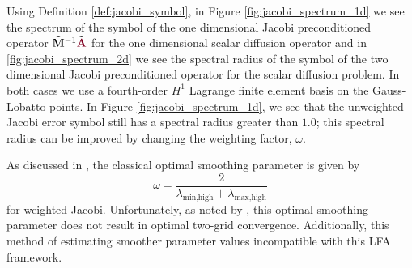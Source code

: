 Using Definition \ref{def:jacobi_symbol}, in Figure \ref{fig:jacobi_spectrum_1d} we see the spectrum of the symbol of the one dimensional Jacobi preconditioned operator $\tilde{\mathbf{M}}^{-1} \tilde{{\color{burgundy}\mathbf{A}}}$ for the one dimensional scalar diffusion operator and in \ref{fig:jacobi_spectrum_2d} we see the spectral radius of the symbol of the two dimensional Jacobi preconditioned operator for the scalar diffusion problem.
In both cases we use a fourth-order $H^1$ Lagrange finite element basis on the Gauss-Lobatto points.
In Figure \ref{fig:jacobi_spectrum_1d}, we see that the unweighted Jacobi error symbol still has a spectral radius greater than $1.0$; this spectral radius can be improved by changing the weighting factor, $\omega$.

As discussed in \cite{he2020two}, the classical optimal smoothing parameter is given by
\begin{equation}
\omega = \frac{2}{\lambda_{\text{min}, \text{high}} + \lambda_{\text{max}, \text{high}}}
\end{equation}
for weighted Jacobi.
Unfortunately, as noted by \cite{he2020two}, this optimal smoothing parameter does not result in optimal two-grid convergence.
Additionally, this method of estimating smoother parameter values incompatible with this LFA framework.
